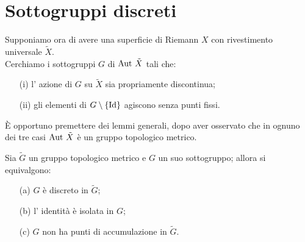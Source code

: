 \section{Sottogruppi discreti}
Supponiamo ora di avere una superficie di Riemann $X$ con rivestimento universale $\tilde X$.\\
Cerchiamo i sottogruppi $G$ di $\text{Aut }{\tilde{X}}$ tali che:
\begin{itemize}
\item[(i)] l' azione di $G$ su $\tilde{X}$ sia propriamente discontinua;
\item[(ii)] gli elementi di $G\setminus\{\text{Id}\}$ agiscono senza punti fissi.
\end{itemize}
È opportuno premettere dei lemmi generali, dopo aver osservato che in ognuno dei tre casi $\text{Aut }{\tilde{X}}$ è un gruppo topologico metrico.
\begin{lemma}Sia $\tilde G$ un gruppo topologico metrico e $G$ un suo sottogruppo; allora si equivalgono:
\begin{itemize}
\item[(a)] $G$ è discreto in $\tilde G$;
\item[(b)] l' identità è isolata in $G$;
\item[(c)] $G$ non ha punti di accumulazione in $\tilde G$.
\end{itemize}
\end{lemma}

